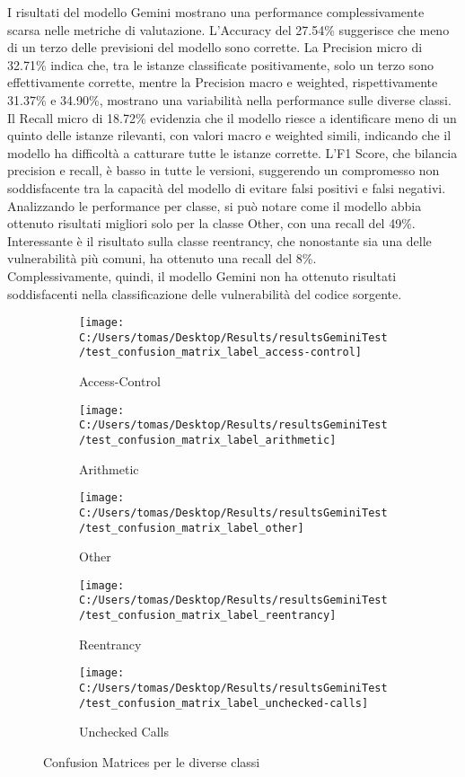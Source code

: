 \documentclass[../../Thesis.tex]{subfiles}
\begin{document}
I risultati del modello Gemini mostrano una performance complessivamente scarsa nelle metriche di valutazione. L'Accuracy del 27.54\% suggerisce che meno di un terzo delle previsioni del modello sono corrette. La Precision micro di 32.71\% indica che, tra le istanze classificate positivamente, solo un terzo sono effettivamente corrette, mentre la Precision macro e weighted, rispettivamente 31.37\% e 34.90\%, mostrano una variabilità nella performance sulle diverse classi. Il Recall micro di 18.72\% evidenzia che il modello riesce a identificare meno di un quinto delle istanze rilevanti, con valori macro e weighted simili, indicando che il modello ha difficoltà a catturare tutte le istanze corrette. L'F1 Score, che bilancia precision e recall, è basso in tutte le versioni, suggerendo un compromesso non soddisfacente tra la capacità del modello di evitare falsi positivi e falsi negativi.\\
Analizzando le performance per classe, si può notare come il modello abbia ottenuto risultati migliori solo per la classe Other, con una recall del 49\%. Interessante è il risultato sulla classe reentrancy, che nonostante sia una delle vulnerabilità più comuni, ha ottenuto una recall del 8\%.\\
Complessivamente, quindi, il modello Gemini non ha ottenuto risultati soddisfacenti nella classificazione delle vulnerabilità del codice sorgente.
\begin{figure}[h!]
    \centering
    \begin{subfigure}[b]{0.1999\textwidth}
        \centering
        \texttt{[image: C:/Users/tomas/Desktop/Results/resultsGeminiTest/test\_confusion\_matrix\_label\_access-control]}
        \caption{Access-Control}
    \end{subfigure}
    \begin{subfigure}[b]{0.1999\textwidth}
        \centering
        \texttt{[image: C:/Users/tomas/Desktop/Results/resultsGeminiTest/test\_confusion\_matrix\_label\_arithmetic]}
        \caption{Arithmetic}
    \end{subfigure}
    \begin{subfigure}[b]{0.1999\textwidth}
        \centering
        \texttt{[image: C:/Users/tomas/Desktop/Results/resultsGeminiTest/test\_confusion\_matrix\_label\_other]}
        \caption{Other}
    \end{subfigure}
    \begin{subfigure}[b]{0.1999\textwidth}
        \centering
        \texttt{[image: C:/Users/tomas/Desktop/Results/resultsGeminiTest/test\_confusion\_matrix\_label\_reentrancy]}
        \caption{Reentrancy}
    \end{subfigure}
    \begin{subfigure}[b]{0.1999\textwidth}
        \centering
        \texttt{[image: C:/Users/tomas/Desktop/Results/resultsGeminiTest/test\_confusion\_matrix\_label\_unchecked-calls]}
        \caption{Unchecked Calls}
    \end{subfigure}
    \caption{Confusion Matrices per le diverse classi}
\end{figure}
\end{document}
